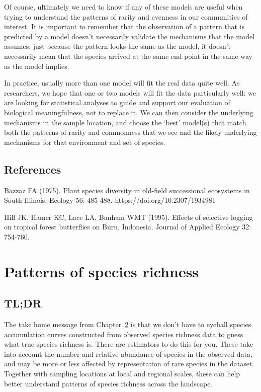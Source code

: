 \documentclass[
  letterpaper,
  DIV=11,
  numbers=noendperiod]{scrreprt}
\begin{document}
Of course, ultimately we need to know if any of these models are useful
when trying to understand the patterns of rarity and evenness in our
communities of interest. It is important to remember that the
observation of a pattern that is predicted by a model doesn't
necessarily validate the mechanisms that the model assumes; just because
the pattern looks the same as the model, it doesn't necessarily mean
that the species arrived at the same end point in the same way as the
model implies.

In practice, usually more than one model will fit the real data quite
well. As researchers, we hope that one or two models will fit the data
particularly well: we are looking for statistical analyses to guide and
support our evaluation of biological meaningfulness, not to replace it.
We can then consider the underlying mechanisms in the sample location,
and choose the `best' model(s) that match both the patterns of rarity
and commonness that we see and the likely underlying mechanisms for that
environment and set of species.

\section{References}\label{references-3}

Bazzaz FA (1975). Plant species diversity in old-field successional
ecosystems in South Illinois. Ecology 56: 485-488.
https://doi.org/10.2307/1934981

Hill JK, Hamer KC, Lace LA, Banham WMT (1995). Effects of selective
logging on tropical forest butterflies on Buru, Indonesia. Journal of
Applied Ecology 32: 754-760.

\chapter{Patterns of species
richness}\label{sec-patterns-species-richness}

\section{TL;DR}\label{tldr}

The take home message from Chapter~\ref{sec-patterns-species-richness}
is that we don't have to eyeball species accumulation curves constructed
from observed species richness data to guess what true species richness
is. There are estimators to do this for you. These take into account the
number and relative abundance of species in the observed data, and may
be more or less affected by representation of rare species in the
dataset. Together with sampling locations at local and regional scales,
these can help better understand patterns of species richness across the
landscape.
\end{document}
